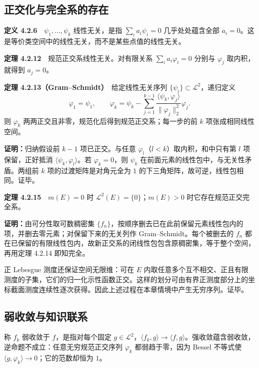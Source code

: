 \documentclass[11pt,a4paper]{article}
\begin{document}
\subsection{正交化与完全系的存在}\label{ch04-s2-ux6b63ux4ea4ux5316ux4e0eux5b8cux5168ux7cfbux7684ux5b58ux5728}

\textbf{定义 4.2.6}　\(\psi_1,\ldots,\psi_k\) 线性无关，是指
\(\sum_ia_i\psi_i=0\) 几乎处处蕴含全部
\(a_i=0\)。这是等价类空间中的线性无关，而不是某些点值的线性无关。

\textbf{定理 4.2.12}　规范正交系线性无关。对有限关系
\(\sum_ia_i\varphi_i=0\) 分别与 \(\varphi_j\) 取内积，就得到 \(a_j=0\)。

\textbf{定理 4.2.13（Gram--Schmidt）}　给定线性无关序列
\(\{\psi_i\}\subset\mathcal L^2\)，递归定义 \[
\varphi_1=\psi_1,\qquad
\varphi_k=\psi_k-\sum_{j=1}^{k-1}
\frac{\langle\psi_k,\varphi_j\rangle}{\|\varphi_j\|_2^2}\varphi_j.
\] 则 \(\varphi_k\) 两两正交且非零，规范化后得到规范正交系；每一步的前
\(k\) 项张成相同线性空间。

\textbf{证明：}归纳假设前 \(k-1\) 项已正交。与任意
\(\varphi_l\)（\(l<k\)）取内积，和中只有第 \(l\) 项保留，正好抵消
\(\langle\psi_k,\varphi_l\rangle\)。若 \(\varphi_k=0\)，则 \(\psi_k\)
在前面元素的线性包中，与无关性矛盾。两组前 \(k\)
项的过渡矩阵是对角元全为 \(1\) 的下三角矩阵，故可逆，线性包相同。证毕。

\textbf{定理 4.2.15}　\(m(E)=0\) 时
\(\mathcal L^2(E)=\{0\}\)；\(m(E)>0\) 时它存在规范正交完全系。

\textbf{证明：}由可分性取可数稠密集
\(\{f_n\}\)，按顺序删去已在此前保留元素线性包内的项，并删去零元素；对保留下来的无关列作
Gram--Schmidt。每个被删去的 \(f_n\)
都在已保留的有限线性包内，故新正交系的闭线性包包含原稠密集，等于整个空间，再用定理
4.2.14 即知完全。

正 Lebesgue 测度还保证空间无限维：可在 \(E\)
内取任意多个互不相交、正且有限测度的子集，它们的归一化示性函数正交。这样的划分可由有界正测度部分上的坐标截面测度连续性逐次获得。因此上述过程在本章情境中产生无穷序列。证毕。

\subsection{弱收敛与知识联系}\label{ch04-s2-ux5f31ux6536ux655bux4e0eux77e5ux8bc6ux8054ux7cfb}

称 \(f_k\) 弱收敛于 \(f\)，是指对每个固定
\(g\in\mathcal L^2\)，\(\langle f_k,g\rangle\to\langle f,g\rangle\)。强收敛蕴含弱收敛，逆命题不成立：任意无穷规范正交序列
\(\varphi_k\) 都弱趋于零，因为 Bessel 不等式使
\(\langle g,\varphi_k\rangle\to0\)；它的范数却恒为 \(1\)。
\end{document}
